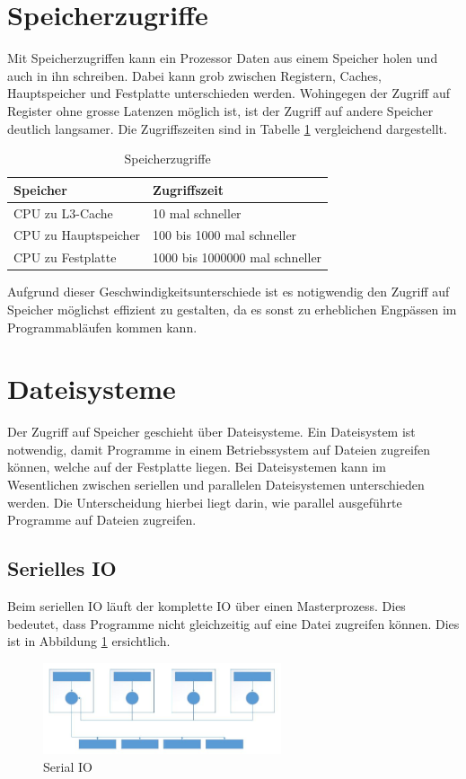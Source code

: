 \section{Speicherzugriffe}
Mit Speicherzugriffen kann ein Prozessor Daten aus einem Speicher holen und auch in ihn schreiben. Dabei kann grob zwischen Registern, Caches, Hauptspeicher und Festplatte unterschieden werden. Wohingegen der Zugriff auf Register ohne grosse Latenzen m\"oglich ist, ist der Zugriff auf andere Speicher deutlich langsamer. Die Zugriffszeiten sind in Tabelle \ref{tab:Speicher} vergleichend dargestellt.
\begin{table}[h]
	\centering
	\begin{tabular}{l|l}
		\textbf{Speicher} & \textbf{Zugriffszeit} \\
		\hline
		CPU zu L3-Cache & 10 mal schneller \\
		\hline
		CPU zu Hauptspeicher & 100 bis 1000 mal schneller \\
		\hline
		CPU zu Festplatte & 1000 bis 1000000 mal schneller \\
	\end{tabular}
	\caption{Speicherzugriffe}
	\label{tab:Speicher}
\end{table}

Aufgrund dieser Geschwindigkeitsunterschiede ist es notigwendig den Zugriff auf Speicher m\"oglichst effizient zu gestalten, da es sonst zu erheblichen Engp\"assen im Programmabl\"aufen kommen kann.

\section{Dateisysteme}
Der Zugriff auf Speicher geschieht \"uber Dateisysteme. Ein Dateisystem ist notwendig, damit Programme in einem Betriebssystem auf Dateien zugreifen k\"onnen, welche auf der Festplatte liegen.
Bei Dateisystemen kann im Wesentlichen zwischen seriellen und parallelen Dateisystemen unterschieden werden. Die Unterscheidung hierbei liegt darin, wie parallel ausgef\"uhrte Programme auf Dateien zugreifen.
\subsection{Serielles IO}
Beim seriellen IO l\"auft der komplette IO \"uber einen Masterprozess. Dies bedeutet, dass Programme nicht gleichzeitig auf eine Datei zugreifen k\"onnen. Dies ist in Abbildung \ref{fig:serial} ersichtlich.
\begin{figure}[h]
	\centering
	\includegraphics[width=7cm]{fig/SerialIO.JPG}
	\caption{Serial IO \cite{Cazes.26.09.2013}}
	\label{fig:serial}
\end{figure}

